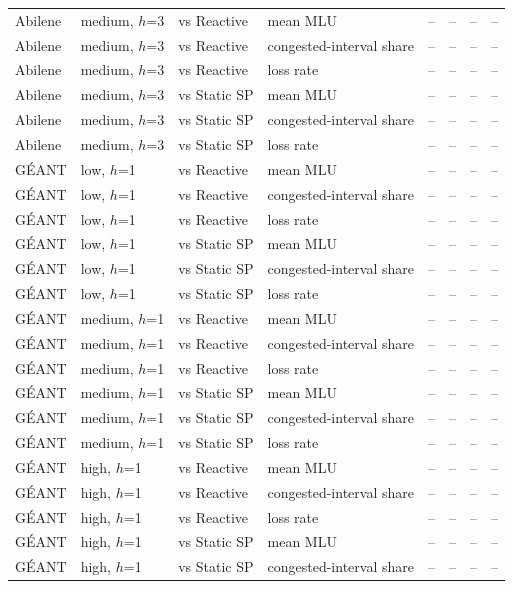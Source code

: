 \begin{table}[t]
\begin{tabular}{@{}llllcccc@{}}
Abilene & medium, $h$=3 & vs Reactive & mean MLU & -- & -- & -- & -- \\
Abilene & medium, $h$=3 & vs Reactive & congested-interval share & -- & -- & -- & -- \\
Abilene & medium, $h$=3 & vs Reactive & loss rate & -- & -- & -- & -- \\
Abilene & medium, $h$=3 & vs Static SP & mean MLU & -- & -- & -- & -- \\
Abilene & medium, $h$=3 & vs Static SP & congested-interval share & -- & -- & -- & -- \\
Abilene & medium, $h$=3 & vs Static SP & loss rate & -- & -- & -- & -- \\
G\'EANT & low, $h$=1 & vs Reactive & mean MLU & -- & -- & -- & -- \\
G\'EANT & low, $h$=1 & vs Reactive & congested-interval share & -- & -- & -- & -- \\
G\'EANT & low, $h$=1 & vs Reactive & loss rate & -- & -- & -- & -- \\
G\'EANT & low, $h$=1 & vs Static SP & mean MLU & -- & -- & -- & -- \\
G\'EANT & low, $h$=1 & vs Static SP & congested-interval share & -- & -- & -- & -- \\
G\'EANT & low, $h$=1 & vs Static SP & loss rate & -- & -- & -- & -- \\
G\'EANT & medium, $h$=1 & vs Reactive & mean MLU & -- & -- & -- & -- \\
G\'EANT & medium, $h$=1 & vs Reactive & congested-interval share & -- & -- & -- & -- \\
G\'EANT & medium, $h$=1 & vs Reactive & loss rate & -- & -- & -- & -- \\
G\'EANT & medium, $h$=1 & vs Static SP & mean MLU & -- & -- & -- & -- \\
G\'EANT & medium, $h$=1 & vs Static SP & congested-interval share & -- & -- & -- & -- \\
G\'EANT & medium, $h$=1 & vs Static SP & loss rate & -- & -- & -- & -- \\
G\'EANT & high, $h$=1 & vs Reactive & mean MLU & -- & -- & -- & -- \\
G\'EANT & high, $h$=1 & vs Reactive & congested-interval share & -- & -- & -- & -- \\
G\'EANT & high, $h$=1 & vs Reactive & loss rate & -- & -- & -- & -- \\
G\'EANT & high, $h$=1 & vs Static SP & mean MLU & -- & -- & -- & -- \\
G\'EANT & high, $h$=1 & vs Static SP & congested-interval share & -- & -- & -- & -- \\

\end{tabular}
\end{table}
